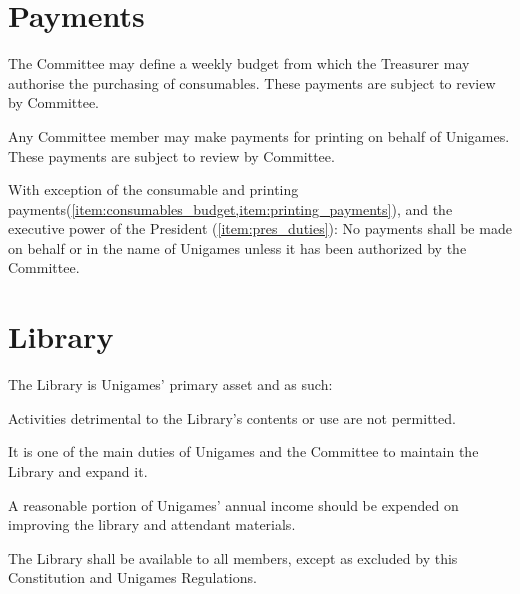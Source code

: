 \documentclass[a4paper]{article}
\begin{document}
\section{Payments} \label{sec:payments}
\begin{myEnumerate}
    \item \label{item:consumables_budget}The Committee may define a weekly budget from which the Treasurer may authorise the purchasing of consumables. These payments are subject to review by Committee.
    \item \label{item:printing_payments} Any Committee member may make payments for printing on behalf of Unigames. These payments are subject to review by Committee.
    \item With exception of the consumable and printing payments(\cref{item:consumables_budget,item:printing_payments}), and the executive power of the President (\cref{item:pres_duties}): No payments shall be made on behalf or in the name of Unigames unless it has been authorized by the Committee.
\end{myEnumerate}


\section{Library} \label{sec:library}
\begin{myEnumerate}
    \item The Library is Unigames' primary asset and as such:
        \begin{myEnumerate}
            \item Activities detrimental to the Library's contents or use are not permitted.
            \item It is one of the main duties of Unigames and the Committee to maintain the Library and expand it.
            \item A reasonable portion of Unigames' annual income should be expended on improving the library and attendant materials.
            \item The Library shall be available to all members, except as excluded by this Constitution and Unigames Regulations.
        \end{myEnumerate}
\end{myEnumerate}
\end{document}
